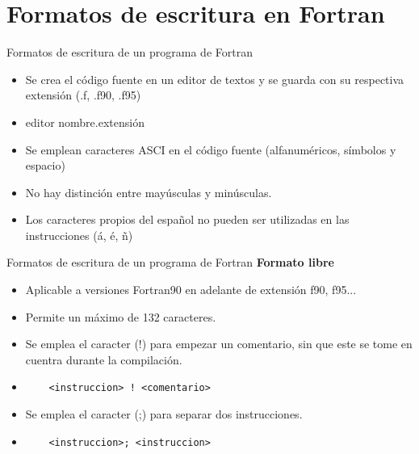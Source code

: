 
\section{Formatos de escritura en Fortran}


\begin{frame}[fragile]{Formatos de escritura de un programa de Fortran}
  \begin{itemize}[<+(1)->]
  \item Se crea el código fuente en un editor de textos y se guarda con su respectiva extensión (.f, .f90, .f95)
  \item [] \begin{mintedbash} 
            editor nombre.extensión
           \end{mintedbash}
  \item Se emplean caracteres ASCI en el código fuente (alfanuméricos, símbolos y espacio)
  \item No hay distinción entre mayúsculas y minúsculas.
  \item Los caracteres propios del español no pueden ser utilizadas en las instrucciones (á, é, ñ)
  \end{itemize}
\end{frame}

\begin{frame}[fragile]{Formatos de escritura de un programa de Fortran}
 \textbf{Formato libre}
  \begin{itemize}[<+(1)->]
   \item Aplicable a versiones Fortran90 en adelante de extensión f90, f95...  
   \item Permite un máximo de 132 caracteres.
   \item Se emplea el caracter (!) para empezar un comentario, sin que este se tome en cuentra durante la compilación.
   \item [] 
    \begin{verbatim}
    <instruccion> ! <comentario>
    \end{verbatim}
   \item Se emplea el caracter (;) para separar dos instrucciones.
   \item [] 
    \begin{verbatim}
    <instruccion>; <instruccion>
    \end{verbatim}
  \end{itemize}
\end{frame} 

